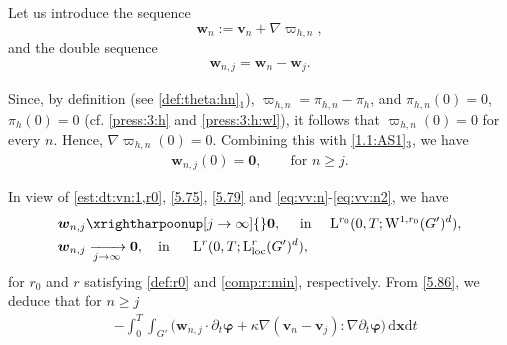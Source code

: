 \documentclass[12pt,reqno]{amsart}
\numberwithin{equation}{section}
\theoremstyle{definition}
\def\dxt{\,\mathrm{d}\boldsymbol{x}\mathrm{d}t}
\def\W{\mathrm{W}}
\def\loc{\mathrm{loc}}
\def\L{\mathrm{L}}
\def\vv{\boldsymbol{v}}
\def\w{\boldsymbol{w}}
\def\00{\boldsymbol{0}}
\def\bfL{\mathbf{L}}
\def\bfV{\mathbf{V}}
\def\bfI{\mathbf{I}}
\def\bfA{\mathbf{A}}
\def\bf0{\mathbf{0}}
\def\bmcA{\boldsymbol{\mathcal{A}}}
\def\bfi{\boldsymbol{\varphi}}
\begin{document}
{%

Let us introduce the sequence
\begin{equation}\label{eq:vv:n}
\w_n:= \vv_n+\nabla \varpi_{h,n},
\end{equation}
and the double sequence
\begin{align}\label{eq:vv:n2}
	\w_{n,j}=\w_n-\w_j.
\end{align}
{Since, by definition (see \eqref{def:theta:hn}$_1$), $\varpi_{h,n} = \pi_{h,n} - \pi_h$, and
$\pi_{h,n}(0) = 0$, $\pi_h(0) = 0$ (cf. \eqref{press:3:h} and \eqref{press:3:h:wl}),
it follows that $\varpi_{h,n}(0) = 0$ for every  $n$.
Hence,
$\nabla \varpi_{h,n}(0) = 0$.
Combining this with \eqref{1.1:AS1}$_3$, we have
\begin{align}\label{eq:vv:n3}
 \w_{n,j}(0)= \00, \qquad\mbox{for $n\geq j$}.
\end{align}

}
{In view of \eqref{est:dt:vn:1,r0}, \eqref{5.75}, \eqref{5.79} and \eqref{eq:vv:n}-\eqref{eq:vv:n2},}  we have
\begin{align}\label{eq:vv:n4}
	\w_{n,j} &\xrightharpoonup[j\to\infty]{} \bf0, \quad \text{ in }\quad \L^{r_0}(0,T;\W^{1,r_0}(G')^{d}), \\\label{eq:vv:n5}
		\w_{n,j}	&	 \xrightarrow[j\to\infty]{} \bf0,\quad \text{in}\quad\ \  \L^r(0,T;\L^r_\loc (G')^d),
\end{align}
for $r_0$ and $r$ satisfying \eqref{def:r0} and \eqref{comp:r:min}, respectively.
{From \eqref{5.86}, we deduce that for $n\geq j$}
{\begin{equation}\label{5.v.nj:p}
\begin{split}
		& -\!\int_{0}^{T}\!\!\!\!\int_{G'} \Big(\w_{n,j}\cdot{\partial_t\bfi} + \kappa\nabla(\vv_n-\vv_j):\nabla{\partial_t\bfi}\Big)\dxt  \\

\end{split}
\end{equation}}}
\end{document}
